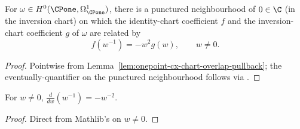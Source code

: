 

\begin{lemma}
\label{lem:cotangent-transition-formula}
For \(\omega\in H^{0}(\CPone,\Omega^{1}_{\CPone})\), there is a
punctured neighbourhood of \(0\in\C\) (in the inversion chart) on
which the identity-chart coefficient \(f\) and the inversion-chart
coefficient \(g\) of \(\omega\) are related by
\[
  f(w^{-1})=-w^{2}g(w),\qquad w\neq 0.
\]
\leanok
\end{lemma}
\begin{proof}\leanok
Pointwise from Lemma~\ref{lem:onepoint-cx-chart-overlap-pullback};
the eventually-quantifier on the punctured neighbourhood follows
via .
\end{proof}

\begin{lemma}
\label{lem:onepoint-cx-chart-overlap-derivative}
For \(w\neq 0\), \(\frac{d}{dw}(w^{-1})=-w^{-2}\).
\leanok
\end{lemma}
\begin{proof}\leanok
Direct from Mathlib's  on \(w\neq 0\).
\end{proof}

